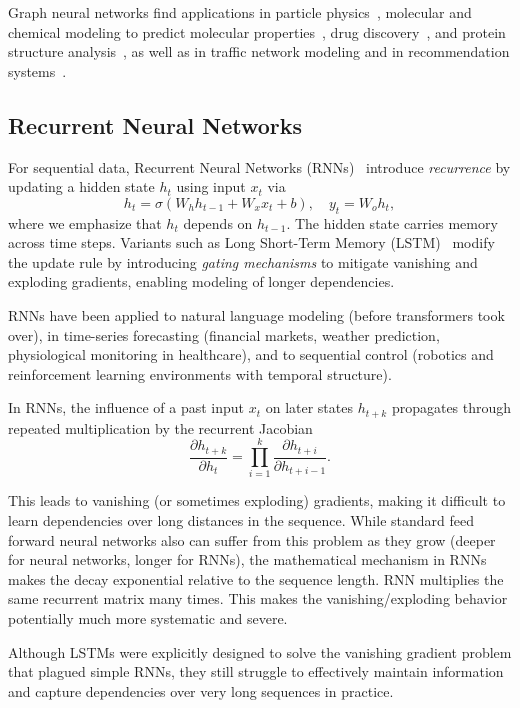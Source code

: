 Graph neural networks find applications in particle physics~\cite{kipf2018neural},  molecular and chemical modeling to predict molecular properties~\cite{kearnes2016molecular},  drug discovery~\cite{bongini2021molecular}, and protein structure analysis~\cite{fout2017protein}, as well as in traffic network modeling and in recommendation systems~\cite{zhou2020graph}.

\subsection{ Recurrent Neural Networks }

For sequential data, Recurrent Neural Networks (RNNs)~\cite{cho2014learning} introduce {\em recurrence} by updating a hidden state $h_t$ using input $x_t$ via
$$
h_t = \sigma(W_h h_{t-1} + W_x x_t + b), \quad y_t = W_o h_t,
$$
where we emphasize that $h_t$ depends on $h_{t-1}$.
The hidden state carries memory across time steps. Variants such as Long Short-Term Memory (LSTM)~\cite{Hochreiter1997} modify the update rule by introducing {\em gating mechanisms} to mitigate vanishing and exploding gradients, enabling modeling of longer dependencies.

RNNs have been applied to natural language modeling (before transformers took over), in
time-series forecasting (financial markets, weather prediction, physiological monitoring in healthcare), and 
to sequential control (robotics and reinforcement learning environments with temporal structure).




In RNNs, the influence of a past input $x_t$ on later states $h_{t+k}$ propagates through repeated multiplication by the recurrent Jacobian
$$
\frac{\partial h_{t+k}}{\partial h_t} = \prod_{i=1}^k \frac{\partial h_{t+i}}{\partial h_{t+i-1}}.
$$

This leads to vanishing (or sometimes exploding) gradients, making it difficult to learn dependencies over long distances in the sequence.
While standard feed forward neural networks also can suffer from this problem as they grow (deeper for neural networks, longer for RNNs), the mathematical mechanism in RNNs makes the decay exponential relative to the sequence length. RNN multiplies the same recurrent matrix many times. This makes the vanishing/exploding behavior potentially much more systematic and severe.

Although LSTMs were explicitly designed to solve the vanishing gradient problem that plagued simple RNNs, they still struggle to effectively maintain information and capture dependencies over very long sequences in practice.

